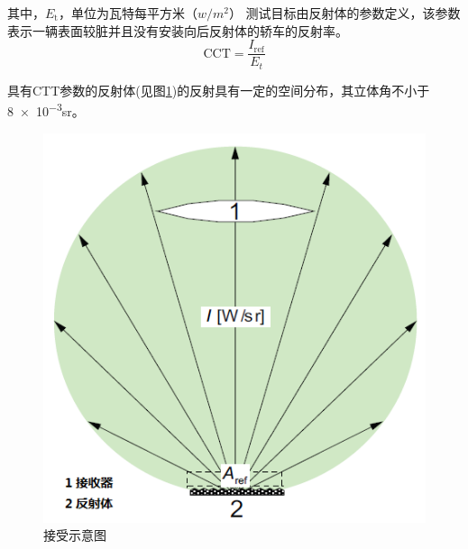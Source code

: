 \documentclass[is,copyright,is]{isov2}
\begin{document}
其中，$E_\text{t}$，单位为瓦特每平方米（$\si{w/m^2}$）
测试目标由反射体的参数定义，该参数表示一辆表面较脏并且没有安装向后反射体的轿车的反射率。
\[\text{CCT} =\frac{I_\text{ref}}{E_t}\]

具有CTT参数的反射体(见图\ref{fig:receiver})的反射具有一定的空间分布，其立体角不小于 \num{8e-3}sr。
\begin{figure}
	\centering
	\includegraphics[width=0.5\linewidth]{figures/receiver}
	\caption{接受示意图}
	\label{fig:receiver}
\end{figure}
\end{document}

